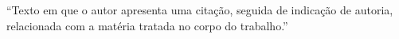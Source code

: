 
\begin{epigrafe}	%
  \vspace*{\fill}	%
  \begin{flushright}
  \begin{minipage}[15cm] {11cm}
  ``Texto em que o autor apresenta uma citação, seguida de indicação de autoria, relacionada com a matéria tratada no corpo do trabalho.''
	\\
  \end{minipage}
  \end{flushright}
  
\end{epigrafe}